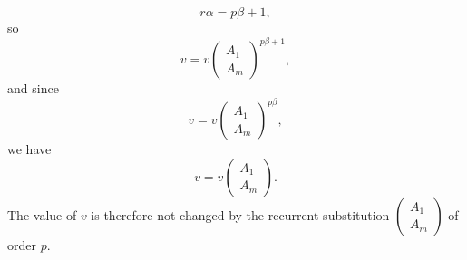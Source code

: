 \documentclass[oneside, 12 pt, leqno]{memoir}
\begin{document}
\[r \alpha=p \beta+1,\]
so
\[v=v\left(\begin{array}{l}A_1 \\A_m\end{array}\right)^{p \beta+1},\]
and since
\[v=v\left(\begin{array}{l}A_1 \\A_m\end{array}\right)^{p \beta},\]
we have
\[v=v\left(\begin{array}{l}A_1 \\A_m\end{array}\right).\]
The value of \(v\) is therefore not changed by the recurrent substitution \(\left(\begin{array}{l}A_1 \\ A_m\end{array}\right)\) of order \(p\).
\end{document}

